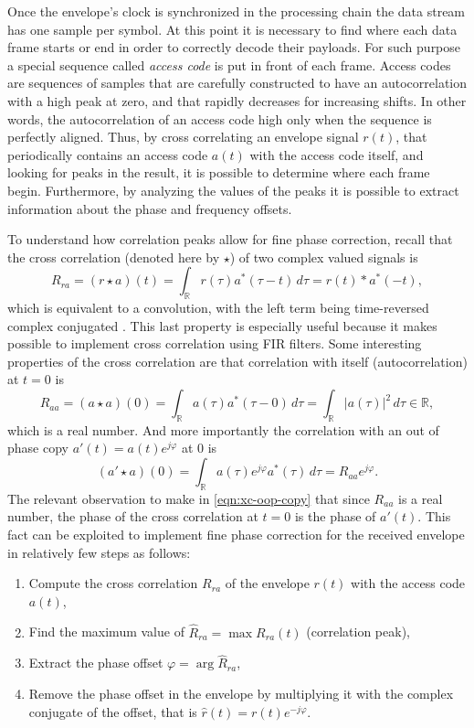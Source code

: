 Once the envelope's clock is synchronized in the processing chain the data stream has one sample per symbol. At this point it is necessary to find where each data frame starts or end in order to correctly decode their payloads. For such purpose a special sequence called \emph{access code} is put in front of each frame. Access codes are sequences of samples that are carefully constructed to have an autocorrelation with a high peak at zero, and that rapidly decreases for increasing shifts. In other words, the autocorrelation of an access code high only when the sequence is perfectly aligned. Thus, by cross correlating an envelope signal \(r(t)\), that periodically contains an access code \(a(t)\) with the access code itself, and looking for peaks in the result, it is possible to determine where each frame begin. Furthermore, by analyzing the values of the peaks it is possible to extract information about the phase and frequency offsets.

To understand how correlation peaks allow for fine phase correction, recall that the cross correlation (denoted here by \(\star\)) of two complex valued signals is
\begin{equation}
	R_{ra}
	= (r \star a)(t)
	= \int_\mathbb{R} r(\tau) a^*(\tau - t) \,d\tau
	= r(t) * a^*(-t),
\end{equation}
which is equivalent to a convolution, with the left term being time-reversed complex conjugated \cite{Gallager}. This last property is especially useful because it makes possible to implement cross correlation using FIR filters. Some interesting properties of the cross correlation are that correlation with itself (autocorrelation) at \(t = 0\) is
\begin{equation}
	R_{aa} = (a \star a)(0)
	= \int_\mathbb{R} a(\tau) a^*(\tau - 0) \,d\tau
	= \int_\mathbb{R} |a(\tau)|^2 \,d\tau \in \mathbb{R},
\end{equation}
which is a real number. And more importantly the correlation with an out of phase copy \(a'(t) = a(t) e^{j\varphi}\) at 0 is
\begin{equation} \label{eqn:xc-oop-copy}
	(a' \star a)(0) 
	= \int_\mathbb{R} a(\tau)e^{j\varphi}  a^*(\tau) \,d\tau
	= R_{aa} e^{j\varphi}.
\end{equation}
The relevant observation to make in \eqref{eqn:xc-oop-copy} that since \(R_{aa}\) is a real number, the phase of the cross correlation at \(t = 0\) is the phase of \(a'(t)\). This fact can be exploited to implement fine phase correction for the received envelope in relatively few steps as follows:
\begin{enumerate}
	\item Compute the cross correlation \(R_{ra}\) of the envelope \(r(t)\) with the access code \(a(t)\),
	\item Find the maximum value of \(\hat{R}_{ra} = \max R_{ra}(t)\) (correlation peak),
	\item Extract the phase offset \(\varphi = \arg \hat{R}_{ra}\),
	\item Remove the phase offset in the envelope by multiplying it with the complex conjugate of the offset, that is \(\hat{r}(t) = r(t) e^{-j\varphi}\).
\end{enumerate}


